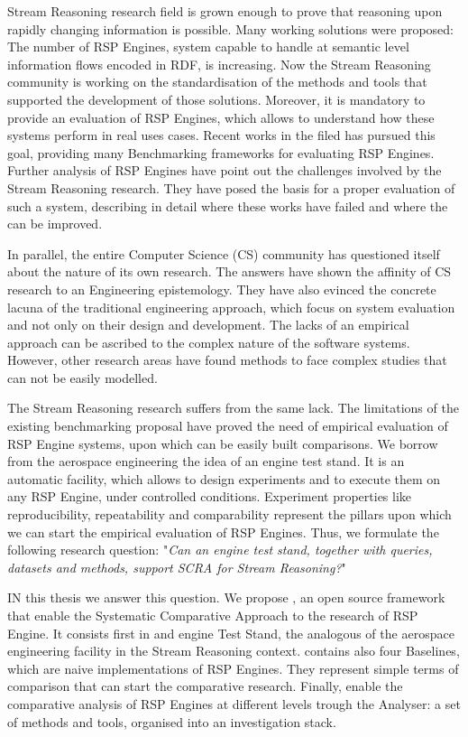 Stream Reasoning research field is grown enough to prove that reasoning upon rapidly changing information is possible. Many working solutions were proposed: The number of RSP Engines, system capable to handle at semantic level information flows encoded in RDF, is increasing. Now the Stream Reasoning community is working on the standardisation of the methods and tools that supported the development of those solutions. Moreover, it is mandatory to provide an evaluation of RSP Engines, which allows to understand how these systems perform in real uses cases. Recent works in the filed has pursued this goal, providing many Benchmarking frameworks for evaluating RSP Engines. Further analysis of RSP Engines have point out the challenges involved by the Stream Reasoning research. They have posed the basis for a proper evaluation of such a system, describing in detail where these works have failed and where the can be improved. 

In parallel, the entire Computer Science (CS) community has questioned itself about the nature of its own research. The answers have shown the affinity of CS research to an Engineering epistemology. They have also evinced the concrete lacuna of the traditional engineering approach, which focus on system evaluation and not only on their design and development. The lacks of an empirical approach can be ascribed to the complex nature of the software systems. However, other research areas have found methods to face complex studies that can not be easily modelled.

The Stream Reasoning research suffers from the same lack. The limitations of the existing benchmarking proposal have proved the need of empirical evaluation of RSP Engine systems, upon which can be easily built comparisons. We borrow from the aerospace engineering the idea of an engine test stand. It is an automatic facility, which allows to design experiments and to execute them on any RSP Engine, under controlled conditions. Experiment properties like reproducibility, repeatability and comparability represent the pillars upon which we can start the empirical evaluation of RSP Engines. Thus, we formulate the following research question: "\textit{Can an engine test stand, together with queries, datasets and methods, support SCRA for Stream Reasoning?}"

IN this thesis we answer this question. We propose \namens, an open source framework that enable the  Systematic Comparative Approach to the research of RSP Engine. It consists first in and engine Test Stand, the analogous of the aerospace engineering facility in the Stream Reasoning context. \name contains also four Baselines, which are naive implementations of RSP Engines. They represent  simple terms of comparison that can start the comparative research. Finally, \name enable the comparative analysis of RSP Engines at different levels trough the Analyser: a set of methods and tools, organised into an investigation stack.
